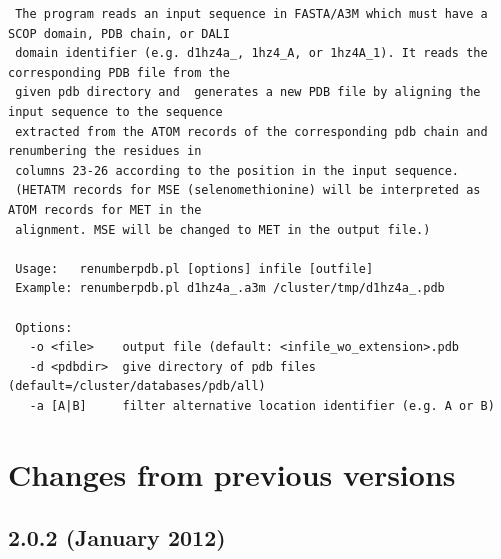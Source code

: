 \documentclass[11pt,a4paper]{article}
\begin{document}
\small 
\begin{verbatim}
 The program reads an input sequence in FASTA/A3M which must have a SCOP domain, PDB chain, or DALI 
 domain identifier (e.g. d1hz4a_, 1hz4_A, or 1hz4A_1). It reads the corresponding PDB file from the 
 given pdb directory and  generates a new PDB file by aligning the input sequence to the sequence 
 extracted from the ATOM records of the corresponding pdb chain and renumbering the residues in 
 columns 23-26 according to the position in the input sequence.
 (HETATM records for MSE (selenomethionine) will be interpreted as ATOM records for MET in the 
 alignment. MSE will be changed to MET in the output file.)
 
 Usage:   renumberpdb.pl [options] infile [outfile] 
 Example: renumberpdb.pl d1hz4a_.a3m /cluster/tmp/d1hz4a_.pdb 

 Options: 
   -o <file>    output file (default: <infile_wo_extension>.pdb
   -d <pdbdir>  give directory of pdb files (default=/cluster/databases/pdb/all)
   -a [A|B]     filter alternative location identifier (e.g. A or B)
\end{verbatim} 
\normalsize



\section{Changes from previous versions}

\subsection{2.0.2 (January 2012)}
\end{document}
